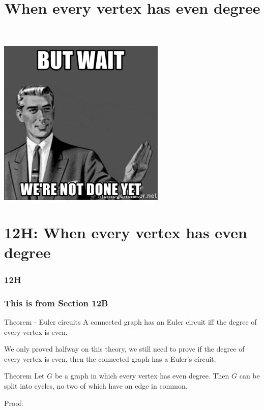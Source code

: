 \documentclass[
	11pt, %
]{beamer}
\begin{document}
\begin{frame}
    \begin{center}
        \includegraphics[width=8cm]{Wait.jpg}    
    \end{center}
\end{frame}

\section{12H: When every vertex has even degree}
\begin{frame}
    \frametitle{12H}
    \begin{center}
        \title{When every vertex has even degree}
        \maketitle
    \end{center}
\end{frame}

\begin{frame}[t]
    \frametitle{This is from Section 12B}
    \begin{block}{Theorem - Euler circuits}
        A connected graph has an Euler circuit iff the degree of every vertex is even.
    \end{block}
    We only proved halfway on this theory, we still need to prove if the degree of every vertex is even, then the connected graph has a Euler's circuit.
    \begin{block}{Theorem}
        Let $G$ be a graph in which every vertex has even degree. Then $G$ can be split into cycles,
no two of which have an edge in common.
    \end{block}
    Proof:
\end{frame}
\begin{frame}
\end{frame}
\begin{frame}
\end{frame}
\end{document}
